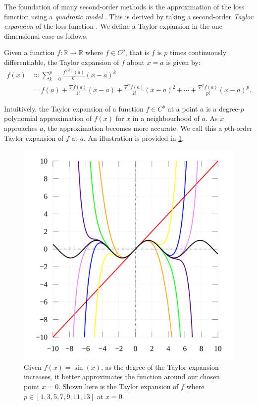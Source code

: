 The foundation of many second-order methods is the approximation of the loss function using a \textit{quadratic model} \citep{NoceWrig06}. This is derived by taking a second-order \textit{Taylor expansion} of the loss function \citep{NoceWrig06}. We define a Taylor expansion in the one dimensional case as follows.
\begin{definition}
    Given a function $f: \mathbb{R} \to \mathbb{R}$ where $f \in C^p$, that is $f$ is $p$ times continuously differentiable, the Taylor expansion of $f$ about $x = a$ is given by:
    \begin{align}
        f(x) 
        &\approx \sum_{k=0}^{p} \frac{f^{(k)}(a)}{k!} (x-a)^k \\
        &= f(a) + \frac{\nabla f(a)}{1!} (x-a) + \frac{\nabla^2 f(a)}{2!} (x-a)^2 + \cdots + \frac{\nabla^p f(a)}{p!} (x-a)^p.
    \end{align}
\end{definition}
Intuitively, the Taylor expansion of a function $f \in C^p$ at a point $a$ is a degree-$p$ polynomial approximation of $f(x)$ for $x$ in a neighbourhood of $a$. As $x$ approaches $a$, the approximation becomes more accurate. We call this a $p$th-order Taylor expansion of $f$ at $a$. An illustration is provided in \cref{fig:taylor_expansion}.

\begin{figure}[h]
    \centering
    \includegraphics[width=0.5\linewidth]{figures/2background/taylor_exp.png}
    \caption{Given $f(x) = \sin(x)$, as the degree of the Taylor expansion increases, it better approximates the function around our chosen point $x=0$. Shown here is the Taylor expansion of $f$ where $p \in [1,3,5,7,9,11,13]$ at $x=0$.}
    \label{fig:taylor_expansion}
\end{figure}

